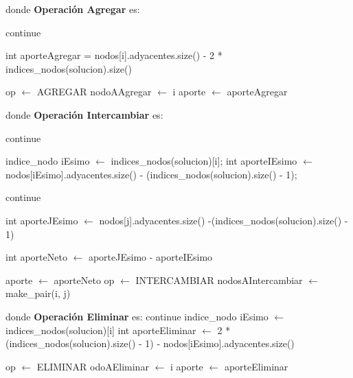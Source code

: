 \documentclass[a4paper, 10pt, twoside]{article}
\newenvironment{pseudo}[1][]{%
    \vspace{1em}%
    \begin{algorithmic}%
}
{%
    \end{algorithmic}%
    \vspace{1em}%
}
\begin{document}
\begin{pseudo}
\EndProcedure
\State
\State donde \textbf{Operación Agregar} es:
\State

			\State continue
			\EndIf

				\State int aporteAgregar = nodos[i].adyacentes.size() - 2 * indices\_nodos(solucion).size()

					\State op $\leftarrow$ AGREGAR
					\State nodoAAgregar $\leftarrow$ i
					\State aporte $\leftarrow$ aporteAgregar
				\EndIf
			\EndIf
		\EndFor

\State
\State donde \textbf{Operación Intercambiar} es:
\State

					\State continue
				\EndIf
				
				\State indice\_nodo iEsimo $\leftarrow$  indices\_nodos(solucion)[i];
				\State int aporteIEsimo $\leftarrow$  nodos[iEsimo].adyacentes.size() -  (indices\_nodos(solucion).size() - 1);
				
						\State continue
					\EndIf



						\State int aporteJEsimo $\leftarrow$ nodos[j].adyacentes.size() -(indices\_nodos(solucion).size() - 1)

						\State int aporteNeto $\leftarrow$ aporteJEsimo - aporteIEsimo

							\State aporte $\leftarrow$ aporteNeto
							\State op $\leftarrow$ INTERCAMBIAR
							\State nodosAIntercambiar $\leftarrow$ make\_pair(i, j)
						\EndIf
					\EndIf
				\EndFor
			\EndFor		

\State
\State donde \textbf{Operación Eliminar} es:
\State
					\State continue
			\EndIf
			\State indice\_nodo iEsimo $\leftarrow$ indices\_nodos(solucion)[i]
			\State int aporteEliminar $\leftarrow$ 2 * (indices\_nodos(solucion).size() - 1) - nodos[iEsimo].adyacentes.size()

				\State op $\leftarrow$ ELIMINAR
				\State odoAEliminar $\leftarrow$ i
				\State aporte $\leftarrow$ aporteEliminar
			\EndIf
		\EndFor

\end{pseudo}
\end{document}

